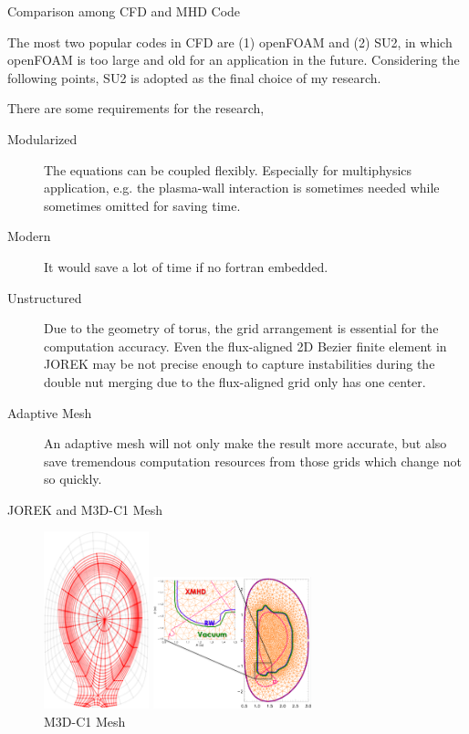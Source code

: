\begin{frame}{Comparison among CFD and MHD Code}
\footnotesize

The most two popular codes in CFD are (1) openFOAM and (2) SU2, in which openFOAM is too large and old for an application in the future. Considering the following points, \alert{SU2} is adopted as the final choice of my research.  

There are some requirements for the research,
\begin{description}
    \item[Modularized]The equations can be coupled flexibly. Especially for multiphysics application, e.g. the plasma-wall interaction is sometimes needed while sometimes omitted for saving time.
    \item[Modern]It would save a lot of time if no fortran embedded.
    \item[Unstructured]Due to the geometry of torus, the grid arrangement is essential for the computation accuracy. Even the flux-aligned 2D Bezier finite element in JOREK may be not precise enough to capture instabilities during the double nut merging due to the flux-aligned grid only has one center. 
    \item[Adaptive Mesh]An adaptive mesh will not only make the result more accurate, but also save tremendous computation resources from those grids which change not so quickly.
\end{description}


\end{frame}


\begin{frame}{JOREK and M3D-C1 Mesh}
\begin{figure}
\begin{minipage}[t]{0.5\linewidth}
\centering
\includegraphics[width=1.2in]{figures/grid_xpoint_medium.png}
\caption{JOREK Mesh}
\end{minipage}%
\begin{minipage}[t]{0.5\linewidth}
\centering
\includegraphics[width=1.8in]{figures/M3D_C1_resistive_wall.png}
\caption{M3D-C1 Mesh}
\end{minipage}
\end{figure}
    
\end{frame}

